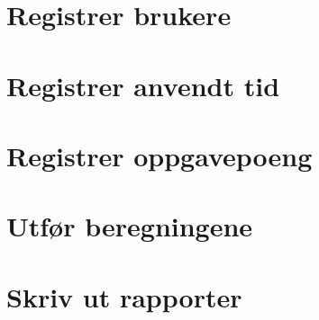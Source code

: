 \documentclass[12pt]{book}
\begin{document}
\section{Registrer brukere}

\section{Registrer anvendt tid}

\section{Registrer oppgavepoeng}

\section{Utfør beregningene}

\section{Skriv ut rapporter}
\end{document}

